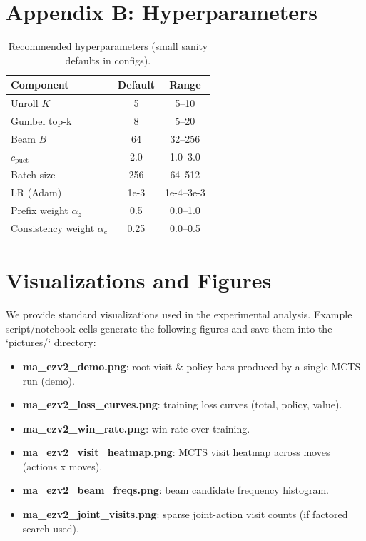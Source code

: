 \documentclass{article}
\begin{document}
\section{Appendix B: Hyperparameters}
\begin{table}[h]
\centering
\begin{tabular}{lcc}
\toprule
Component & Default & Range \\
\midrule
Unroll $K$ & 5 & 5--10 \\
Gumbel top-k & 8 & 5--20 \\
Beam $B$ & 64 & 32--256 \\
$c_{\text{puct}}$ & 2.0 & 1.0--3.0 \\
Batch size & 256 & 64--512 \\
LR (Adam) & 1e-3 & 1e-4--3e-3 \\
Prefix weight $\alpha_z$ & 0.5 & 0.0--1.0 \\
Consistency weight $\alpha_c$ & 0.25 & 0.0--0.5 \\
\bottomrule
\end{tabular}
\caption{Recommended hyperparameters (small sanity defaults in configs).}
\end{table}

\section{Visualizations and Figures}
We provide standard visualizations used in the experimental analysis. Example script/notebook cells generate the following figures and save them into the `pictures/` directory:
\begin{itemize}
  \item \textbf{ma\_ezv2\_demo.png}: root visit & policy bars produced by a single MCTS run (demo).
  \item \textbf{ma\_ezv2\_loss\_curves.png}: training loss curves (total, policy, value).
  \item \textbf{ma\_ezv2\_win\_rate.png}: win rate over training.
  \item \textbf{ma\_ezv2\_visit\_heatmap.png}: MCTS visit heatmap across moves (actions x moves).
  \item \textbf{ma\_ezv2\_beam\_freqs.png}: beam candidate frequency histogram.
  \item \textbf{ma\_ezv2\_joint\_visits.png}: sparse joint-action visit counts (if factored search used).
\end{itemize}
\end{document}
